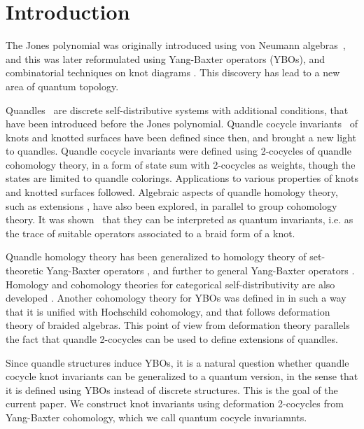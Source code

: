 \documentclass[11pt,fleqn]{amsart} %
\begin{document}
\date{\empty}



\tableofcontents


\section{Introduction}

The Jones polynomial was originally introduced using von Neumann algebras~\cite{Jones}, and this was later reformulated using Yang-Baxter operators (YBOs), and 
combinatorial techniques on knot diagrams \cite{Kauffman}. 
This discovery has lead to a new area of quantum topology.

Quandles~\cite{Joyce,Matveev} are  discrete self-distributive  systems with  additional conditions,  
that have been introduced before the Jones polynomial. 
Quandle cocycle invariants~\cite{CJKLS} of knots and knotted surfaces have been defined since then, 
and brought a new light to quandles.
	Quandle cocycle invariants were  defined using 2-cocycles of quandle cohomology theory, in a form of state sum
with 2-cocycles as weights, though the states are limited to  quandle colorings.
Applications to various properties of knots and knotted surfaces followed.
Algebraic aspects of quandle homology theory, such as extensions \cite{CENS}, have also been explored,
in parallel to group cohomology theory. 
It was shown~\cite{Grana} that they can be interpreted as quantum invariants,  i.e. as the trace of suitable operators associated to a braid form of a knot.

Quandle homology theory has been generalized to homology theory of set-theoretic Yang-Baxter operators 
\cite{CES}, and further to general Yang-Baxter operators \cite{Eis,Eis1,Lebed,Jozef}.
Homology and cohomology theories for categorical self-distributivity are also developed \cite{cat_SD,coh_deform}. 
Another cohomology theory for YBOs was defined in \cite{SZ-YBH} in such a way that it is unified with Hochschild cohomology, and that follows deformation theory of  braided algebras. This  point of view from deformation theory parallels the fact that quandle 2-cocycles can be used to define extensions of quandles.

Since quandle structures induce YBOs, it is  a natural question whether quandle cocycle knot invariants can be generalized to a quantum version, in the sense 
that it is defined using YBOs instead of discrete structures. This is the goal of the current paper. We construct knot invariants using deformation 2-cocycles from Yang-Baxter cohomology, which  we call quantum cocycle invariamnts.  
\end{document}
